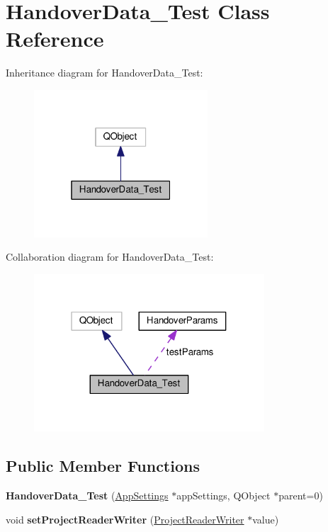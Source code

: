 \hypertarget{class_handover_data___test}{}\section{Handover\+Data\+\_\+\+Test Class Reference}
\label{class_handover_data___test}


Inheritance diagram for Handover\+Data\+\_\+\+Test\+:
\nopagebreak
\begin{figure}[H]
\begin{center}
\leavevmode
\includegraphics[width=184pt]{class_handover_data___test__inherit__graph}
\end{center}
\end{figure}


Collaboration diagram for Handover\+Data\+\_\+\+Test\+:
\nopagebreak
\begin{figure}[H]
\begin{center}
\leavevmode
\includegraphics[width=244pt]{class_handover_data___test__coll__graph}
\end{center}
\end{figure}
\subsection*{Public Member Functions}
\begin{DoxyCompactItemize}
\item 
{\bfseries Handover\+Data\+\_\+\+Test} (\hyperlink{class_app_settings}{App\+Settings} $\ast$app\+Settings, Q\+Object $\ast$parent=0)\hypertarget{class_handover_data___test_a0017ba4b1d791d631412d057ce0936be}{}\label{class_handover_data___test_a0017ba4b1d791d631412d057ce0936be}

\item 
void {\bfseries set\+Project\+Reader\+Writer} (\hyperlink{class_project_reader_writer}{Project\+Reader\+Writer} $\ast$value)\hypertarget{class_handover_data___test_a6d191ea39d2691b05a69f9319a9307eb}{}\label{class_handover_data___test_a6d191ea39d2691b05a69f9319a9307eb}

\end{DoxyCompactItemize}
